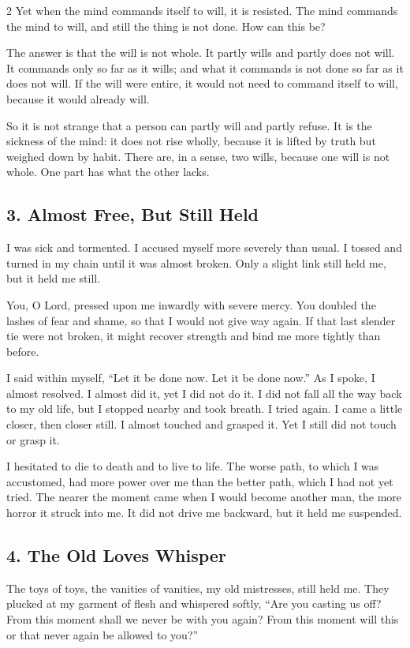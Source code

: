 \documentclass[12pt]{article}
\begin{document}
\begin{multicols}{2}
Yet when the mind commands itself to will, it is resisted. The mind commands the mind to will, and still the thing is not done. How can this be?

The answer is that the will is not whole. It partly wills and partly does not will. It commands only so far as it wills; and what it commands is not done so far as it does not will. If the will were entire, it would not need to command itself to will, because it would already will.

So it is not strange that a person can partly will and partly refuse. It is the sickness of the mind: it does not rise wholly, because it is lifted by truth but weighed down by habit. There are, in a sense, two wills, because one will is not whole. One part has what the other lacks.

\subsection*{3. Almost Free, But Still Held}
I was sick and tormented. I accused myself more severely than usual. I tossed and turned in my chain until it was almost broken. Only a slight link still held me, but it held me still.

You, O Lord, pressed upon me inwardly with severe mercy. You doubled the lashes of fear and shame, so that I would not give way again. If that last slender tie were not broken, it might recover strength and bind me more tightly than before.

I said within myself, ``Let it be done now. Let it be done now.'' As I spoke, I almost resolved. I almost did it, yet I did not do it. I did not fall all the way back to my old life, but I stopped nearby and took breath. I tried again. I came a little closer, then closer still. I almost touched and grasped it. Yet I still did not touch or grasp it.

I hesitated to die to death and to live to life. The worse path, to which I was accustomed, had more power over me than the better path, which I had not yet tried. The nearer the moment came when I would become another man, the more horror it struck into me. It did not drive me backward, but it held me suspended.

\subsection*{4. The Old Loves Whisper}
The toys of toys, the vanities of vanities, my old mistresses, still held me. They plucked at my garment of flesh and whispered softly, ``Are you casting us off? From this moment shall we never be with you again? From this moment will this or that never again be allowed to you?''


\end{multicols}
\end{document}
